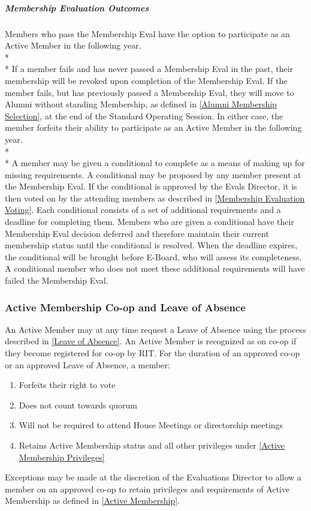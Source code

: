 \documentclass{article}
\newcommand{\asubsection}[1]{\subsubsection{#1} \label{#1}}
\newcommand{\asubsubsubsection}[1]{\subparagraph{#1} \label{#1}}
\begin{document}
\asubsubsubsection{Membership Evaluation Outcomes}
Members who pass the Membership Eval have the option to participate as an Active Member in the following year.
\\* \\*
If a member fails and has never passed a Membership Eval in the past, their membership will be revoked upon completion of the Membership Eval.
If the member fails, but has previously passed a Membership Eval, they will move to Alumni without standing Membership, as defined in \ref{Alumni Membership Selection}, at the end of the Standard Operating Session.
In either case, the member forfeits their ability to participate as an Active Member in the following year.
\\* \\*
A member may be given a conditional to complete as a means of making up for missing requirements.
A conditional may be proposed by any member present at the Membership Eval.
If the conditional is approved by the Evals Director, it is then voted on by the attending members as described in \ref{Membership Evaluation Voting}.
Each conditional consists of a set of additional requirements and a deadline for completing them.
Members who are given a conditional have their Membership Eval decision deferred and therefore maintain their current membership status until the conditional is resolved.
When the deadline expires, the conditional will be brought before E-Board, who will assess its completeness.
A conditional member who does not meet these additional requirements will have failed the Membership Eval.

\asubsection{Active Membership Co-op and Leave of Absence}
\renewcommand{\theenumi}{\alph{enumi}} %

An Active Member may at any time request a Leave of Absence using the process described in \ref{Leave of Absence}.
An Active Member is recognized as on co-op if they become registered for co-op by RIT.
For the duration of an approved co-op or an approved Leave of Absence, a member:
\begin{enumerate}
	\item Forfeits their right to vote
	\item Does not count towards quorum
	\item Will not be required to attend House Meetings or directorship meetings
	\item Retains Active Membership status and all other privileges under \ref{Active Membership Privileges}
\end{enumerate}
Exceptions may be made at the discretion of the Evaluations Director to allow a member on an approved co-op to retain privileges and requirements of Active Membership as defined in \ref{Active Membership}.
\end{document}
